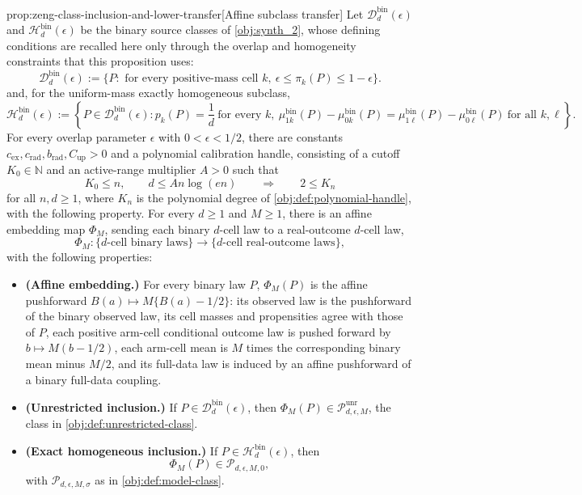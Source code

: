 \documentclass[11pt]{article}
\begin{document}
\begin{propositionv}{prop:zeng-class-inclusion-and-lower-transfer}[Affine subclass transfer]
Let \(\mathcal D_d^{\mathrm{bin}}(\epsilon)\) and \(\mathcal H_d^{\mathrm{bin}}(\epsilon)\) be the binary source classes of \cref{obj:synth_2}, whose defining conditions are recalled here only through the overlap and homogeneity constraints that this proposition uses:
\[
\mathcal D_d^{\mathrm{bin}}(\epsilon)
:=
\{P:\text{ for every positive-mass cell }k,\ 
\epsilon\le \pi_k(P)\le 1-\epsilon\}.
\]
and, for the uniform-mass exactly homogeneous subclass,
\[
\mathcal H_d^{\mathrm{bin}}(\epsilon)
:=
\left\{
P\in\mathcal D_d^{\mathrm{bin}}(\epsilon):
p_k(P)=\frac1d\ \text{for every }k,\ 
\mu_{1k}^{\mathrm{bin}}(P)-\mu_{0k}^{\mathrm{bin}}(P)
=
\mu_{1\ell}^{\mathrm{bin}}(P)-\mu_{0\ell}^{\mathrm{bin}}(P)
\ \text{for all }k,\ell
\right\}.
\]
For every overlap parameter \(\epsilon\) with \(0<\epsilon<1/2\), there are constants
\(c_{\mathrm{ex}},c_{\mathrm{rad}},b_{\mathrm{rad}},C_{\mathrm{up}}>0\) and a polynomial
calibration handle, consisting of a cutoff \(K_0\in\mathbb N\) and an active-range multiplier
\(A>0\) such that
\[
K_0\le n,\qquad d\le A n\log(en)
\qquad\Longrightarrow\qquad
2\le K_n
\]
for all \(n,d\ge1\), where \(K_n\) is the polynomial degree of \cref{obj:def:polynomial-handle}, with the following property.  For every \(d\ge1\) and \(M\ge1\), there is an affine embedding map \(\Phi_M\), sending each binary \(d\)-cell law to a real-outcome \(d\)-cell law,
\[
\Phi_M:\{d\text{-cell binary laws}\}\longrightarrow \{d\text{-cell real-outcome laws}\},
\]
with the following properties:
\begin{itemize}
\item \textbf{(Affine embedding.)} For every binary law \(P\), \(\Phi_M(P)\) is the affine pushforward \(B(a)\mapsto M\{B(a)-1/2\}\): its observed law is the pushforward of the binary observed law, its cell masses and propensities agree with those of \(P\), each positive arm-cell conditional outcome law is pushed forward by \(b\mapsto M(b-1/2)\), each arm-cell mean is \(M\) times the corresponding binary mean minus \(M/2\), and its full-data law is induced by an affine pushforward of a binary full-data coupling.

\item \textbf{(Unrestricted inclusion.)} If \(P\in\mathcal D_d^{\mathrm{bin}}(\epsilon)\), then \(\Phi_M(P)\in\mathcal P_{d,\epsilon,M}^{\mathrm{unr}}\), the class in \cref{obj:def:unrestricted-class}.

\item \textbf{(Exact homogeneous inclusion.)} If \(P\in\mathcal H_d^{\mathrm{bin}}(\epsilon)\), then
\[
\Phi_M(P)\in\mathcal P_{d,\epsilon,M,0},
\]
with \(\mathcal P_{d,\epsilon,M,\sigma}\) as in \cref{obj:def:model-class}.


\end{itemize}
\end{propositionv}
\end{document}
